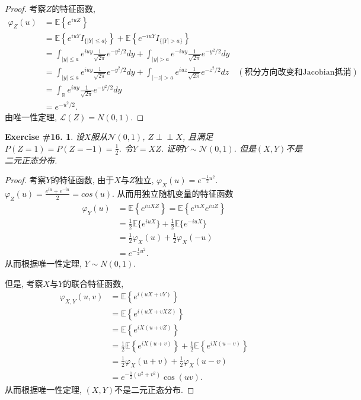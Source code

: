 \documentclass[UTF8, a4paper]{article}
\newcommand{\Perp}{\perp\!\!\!\!\perp}
\newtheorem{exercise}{Exercise \#16.}
\begin{document}
\begin{proof}
考察\(Z\)的特征函数, 
\begin{align*}
    \varphi_Z(u) &= \mathbb{E}\left\{e^{iuZ}\right\} \\
    &= \mathbb{E}\left\{e^{iuY}I_{\{|Y| \leq a\}}\right\} + \mathbb{E}\left\{e^{-iuY}I_{\{|Y| > a\}}\right\} \\
    &= \int_{|y| \leq a} e^{iuy} \frac{1}{\sqrt{2\pi}} e^{-y^2/2} dy + \int_{|y| > a} e^{-iuy} \frac{1}{\sqrt{2\pi}} e^{-y^2/2} dy \\
    &= \int_{|y| \leq a} e^{iuy} \frac{1}{\sqrt{2\pi}} e^{-y^2/2} dy + \int_{|-z| > a} e^{iuz} \frac{1}{\sqrt{2\pi}} e^{-z^2/2} dz \quad (\text{积分方向改变和Jacobian抵消}) \\
    &= \int_{\mathbb{R}} e^{iuy} \frac{1}{\sqrt{2\pi}} e^{-y^2/2} dy \\
    &= e^{-u^2/2}.
\end{align*}
由唯一性定理, \(\mathcal{L}(Z) = N(0, 1)\).

\end{proof}


\begin{framed}
\begin{exercise}
设\(X\)服从\(\mathcal{N}(0, 1)\), \(Z \Perp X\), 且满足\(P(Z = 1) = P(Z = -1) = \frac{1}{2}\).
令\(Y = XZ\). 证明\(Y \sim \mathcal{N}(0, 1)\). 但是\((X,Y)\)不是二元正态分布.
\end{exercise}
\end{framed}


\begin{proof}
考察\(Y\)的特征函数, 由于\(X\)与\(Z\)独立, \(\varphi_X(u) = e^{-\frac{1}{2}u^2}\).
\(\varphi_Z(u) = \frac{e^{iu} + e^{-iu}}{2} = cos(u)\).
从而用独立随机变量的特征函数
\begin{align*}
    \varphi_Y(u) &= \mathbb{E}\left\{e^{iuXZ}\right\} = \mathbb{E}\left\{e^{iuX}e^{iuZ}\right\} \\
    &= \frac{1}{2} \mathbb{E}\{e^{iuX}\} + \frac{1}{2} \mathbb{E}\{e^{-iuX}\} \\
    &= \frac{1}{2} \varphi_X(u) + \frac{1}{2} \varphi_X(-u) \\
    &= e^{-\frac{1}{2}u^2}.
\end{align*}
从而根据唯一性定理, \(Y \sim N(0, 1)\).

但是, 考察\(X\)与\(Y\)的联合特征函数,
\begin{align*}
    \varphi_{X,Y}(u,v) &= \mathbb{E}\left\{e^{i(uX + vY)}\right\} \\
    &= \mathbb{E}\left\{e^{i(uX + vXZ)}\right\} \\
    &= \mathbb{E}\left\{e^{iX(u + vZ)}\right\} \\
    &= \frac{1}{2} \mathbb{E}\left\{e^{iX(u + v)}\right\} + \frac{1}{2} \mathbb{E}\left\{e^{iX(u - v)}\right\} \\
    &= \frac{1}{2} \varphi_X(u + v) + \frac{1}{2} \varphi_X(u - v) \\
    &= e^{-\frac{1}{2}(u^2 + v^2)} \cos(uv).
\end{align*}
从而根据唯一性定理, \((X, Y)\)不是二元正态分布.
\end{proof}
\end{document}
